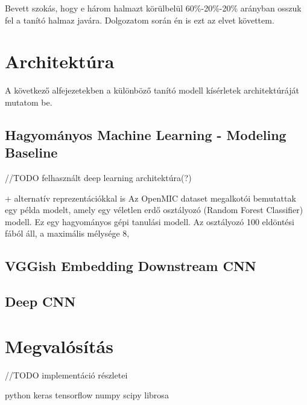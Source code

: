 Bevett szokás, hogy e három halmazt körülbelül 60\%-20\%-20\% arányban osszuk fel a tanító halmaz javára. \cite{traintestvalid} Dolgozatom során én is ezt az elvet követtem.

\section{Architektúra}

A következő alfejezetekben a különböző tanító modell kísérletek architektúráját mutatom be.

\subsection{Hagyományos Machine Learning - Modeling Baseline}
//TODO felhasznált deep learning architektúra(?)

+ alternatív reprezentációkkal is
Az OpenMIC dataset megalkotói bemutattak egy példa modelt, amely egy véletlen erdő osztályozó (Random Forest Classifier) modell. Ez egy hagyományos gépi tanulási modell. Az osztályozó 100 eldöntési fából áll, a maximális mélysége 8, 

\subsection{VGGish Embedding Downstream CNN}


\subsection{Deep CNN}


\section{Megvalósítás}

//TODO implementáció részletei

python keras tensorflow numpy scipy librosa 